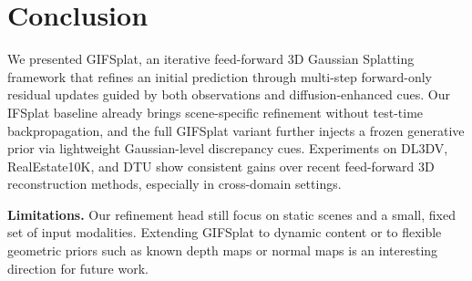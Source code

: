 \section{Conclusion}
\label{sec:conclusion}



We presented GIFSplat, an iterative feed-forward 3D Gaussian Splatting framework that refines an initial prediction through multi-step forward-only residual updates guided by both observations and diffusion-enhanced cues. Our IFSplat baseline already brings scene-specific refinement without test-time backpropagation, and the full GIFSplat variant further injects a frozen generative prior via lightweight Gaussian-level discrepancy cues. Experiments on DL3DV, RealEstate10K, and DTU show consistent gains over recent feed-forward 3D reconstruction methods, especially in cross-domain settings.


\noindent\textbf{Limitations.}
Our refinement head still focus on static scenes and a small, fixed set of input modalities. Extending GIFSplat to dynamic content or to flexible geometric priors such as known depth maps or normal maps is an interesting direction for future work.

